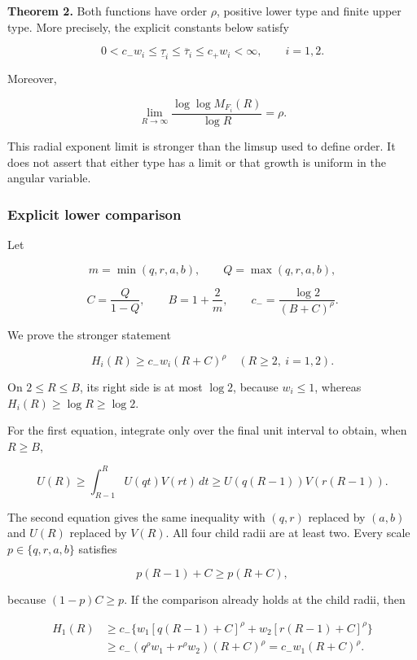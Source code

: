 \textbf{Theorem 2.} Both functions have order \(\rho\), positive lower
type and finite upper type. More precisely, the explicit constants below
satisfy

\[
0<c_-w_i\le\underline\tau_i\le\overline\tau_i\le c_+w_i<\infty,
\qquad i=1,2.
\]

Moreover,

\[
\lim_{R\to\infty}\frac{\log\log M_{F_i}(R)}{\log R}=\rho.
\]

This radial exponent limit is stronger than the limsup used to define
order. It does not assert that either type has a limit or that growth is
uniform in the angular variable.

\hypertarget{v11-coupled_growth_full-explicit-lower-comparison}{%
\subsubsection{Explicit lower
comparison}\label{v11-coupled_growth_full-explicit-lower-comparison}}

Let

\[
m=\min(q,r,a,b),\qquad Q=\max(q,r,a,b),
\]

\[
C=\frac{Q}{1-Q},\qquad B=1+\frac2m,
\qquad c_-=\frac{\log2}{(B+C)^\rho}.
\]

We prove the stronger statement

\[
\boxed{H_i(R)\ge c_-w_i(R+C)^\rho\quad(R\ge2,\ i=1,2).}
\]

On \(2\le R\le B\), its right side is at most \(\log2\), because
\(w_i\le1\), whereas \(H_i(R)\ge\log R\ge\log2\).

For the first equation, integrate only over the final unit interval to
obtain, when \(R\ge B\),

\[
U(R)\ge\int_{R-1}^R U(qt)V(rt)\,dt
\ge U(q(R-1))V(r(R-1)).
\]

The second equation gives the same inequality with \((q,r)\) replaced by
\((a,b)\) and \(U(R)\) replaced by \(V(R)\). All four child radii are at
least two. Every scale \(p\in\{q,r,a,b\}\) satisfies

\[
p(R-1)+C\ge p(R+C),
\]

because \((1-p)C\ge p\). If the comparison already holds at the child
radii, then

\[
\begin{aligned}
H_1(R)&\ge c_-\{w_1[q(R-1)+C]^\rho
                     +w_2[r(R-1)+C]^\rho\}\\
&\ge c_-(q^\rho w_1+r^\rho w_2)(R+C)^\rho
=c_-w_1(R+C)^\rho.
\end{aligned}
\]

